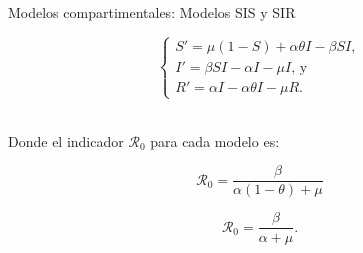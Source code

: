 \documentclass[9pt]{beamer}
\begin{document}
\begin{frame}{Modelos compartimentales: Modelos SIS y SIR}
\begin{minipage}{0.48\textwidth}
\end{minipage}
\hfill
\begin{minipage}{0.48\textwidth}
\begin{equation*}\label{eq:Modelo SIR}
\left\{
\begin{array}{l}
S' = \mu(1 - S) + \alpha\theta I - \beta S I, \\
I' = \beta S I - \alpha I - \mu I\text{, y } \\
R' = \alpha I - \alpha\theta I - \mu R.
\end{array}
\right.
\end{equation*}
\end{minipage}\\
Donde el indicador $\mathcal{R}_0$ para cada modelo es:\\
\begin{minipage}{0.48\textwidth}
$$\mathcal{R}_0 = \frac{\beta}{\alpha(1-\theta)+\mu}$$
\end{minipage}
\hfill
\begin{minipage}{0.48\textwidth}
$$\mathcal{R}_0 = \frac{\beta}{\alpha+\mu}.$$
\end{minipage}
\end{frame}
\end{document}
